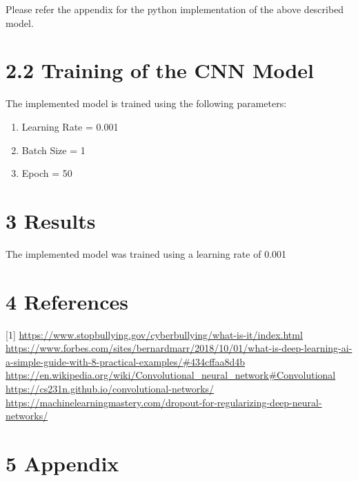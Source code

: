 \documentclass[12pt]{report}
\begin{document}
Please refer the appendix for the python implementation of the above described model. 

\section*{2.2 Training of the CNN Model}
The implemented model is trained using the following parameters:
\begin{enumerate}
	\item Learning Rate = 0.001
	\item Batch Size = 1
	\item Epoch = 50
\end{enumerate}



\newpage

\section*{3 Results}
The implemented model was trained using a learning rate of 0.001 



\newpage
\section*{4 References}
[1] \url{https://www.stopbullying.gov/cyberbullying/what-is-it/index.html} \\ \newline
[2] \url{https://www.forbes.com/sites/bernardmarr/2018/10/01/what-is-deep-learning-ai-a-simple-guide-with-8-practical-examples/#434cffaa8d4b} \\ \newline
[3] \url{https://en.wikipedia.org/wiki/Convolutional_neural_network#Convolutional} \\ \newline
[4] \url{https://cs231n.github.io/convolutional-networks/} \\ \newline
[5] \url{https://machinelearningmastery.com/dropout-for-regularizing-deep-neural-networks/}

\newpage

\section*{5 Appendix}
\end{document}
